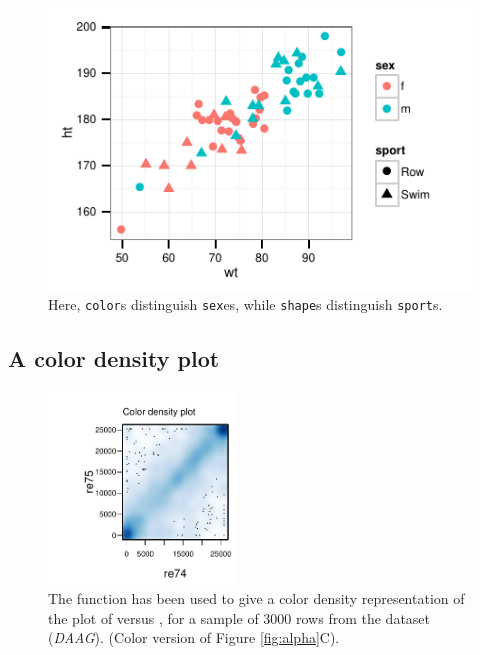 \begin{figure}
\begin{center}
\begin{minipage}[c]{0.85\textwidth}
\includegraphics[trim=0 18 0 12]{colorArt/colshape.pdf}
\end{minipage}
\end{center}
  \caption{Here, \texttt{color}s distinguish \texttt{sex}es,
while \texttt{shape}s distinguish \texttt{sport}s.}\label{col:colshape}
\end{figure}

\newpage

\subsection*{A color density plot}

\begin{figure}[h]
\vspace*{-30pt}
\begin{Schunk}


\centerline{\includegraphics[width=0.44\textwidth]{figs/18-smoothScatter-1} }

\end{Schunk}
\caption{The function  has been used to give
  a color density representation of the plot of  versus
  , for a sample of 3000 rows from the dataset 
({\em DAAG}).  (Color version of Figure
\ref{fig:alpha}C).\label{col:alphaC}}
\vspace*{-12pt}
\end{figure}

